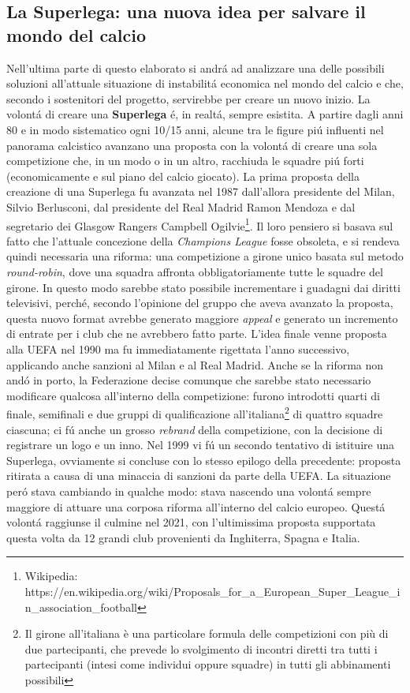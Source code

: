 \documentclass[
    corpo=12pt,
    oneside,
    evenboxes,
    tipotesi=triennale,
    stile=classica,
    oldstyle,
    autoretitolo,
    greek,
]{toptesi}
\begin{document}
\begin{interlinea}{1.5}
\chapter{La Superlega: una nuova idea per salvare il mondo del calcio}
Nell'ultima parte di questo elaborato si andr\'a ad analizzare una delle possibili soluzioni all'attuale situazione di 
instabilit\'a economica nel mondo del calcio e che, secondo i sostenitori del progetto, servirebbe per creare un nuovo inizio.
La volont\'a di creare una \textbf{Superlega} \'e, in realt\'a, sempre esistita. A partire dagli anni 80 e in modo sistematico ogni 10/15 
anni, alcune tra le figure pi\'u influenti nel panorama calcistico avanzano una proposta con la volont\'a di creare una sola competizione che,
in un modo o in un altro, racchiuda le squadre pi\'u forti (economicamente e sul piano del calcio giocato).\newline
La prima proposta della creazione di una Superlega fu avanzata nel 1987 dall'allora presidente del Milan, Silvio Berlusconi, dal presidente
del Real Madrid Ramon Mendoza e dal segretario dei Glasgow Rangers Campbell Ogilvie\footnote{Wikipedia: \newline https://en.wikipedia.org/wiki/Proposals\_for\_a\_European\_Super\_League\_in\_association\_football}.
Il loro pensiero si basava sul fatto che l'attuale concezione della \emph{Champions League} fosse obsoleta, e si rendeva quindi necessaria una riforma:
una competizione a girone unico basata sul metodo \emph{round-robin}, dove una squadra affronta obbligatoriamente tutte le squadre del girone. 
In questo modo sarebbe stato possibile incrementare i guadagni dai diritti televisivi, perch\'e, secondo l'opinione del gruppo che aveva 
avanzato la proposta, questa nuovo format avrebbe generato maggiore \emph{appeal} e generato un incremento di entrate per i club che 
ne avrebbero fatto parte. L'idea finale venne proposta alla UEFA nel 1990 ma fu immediatamente rigettata l'anno successivo, applicando anche 
sanzioni al Milan e al Real Madrid. Anche se la riforma non and\'o in porto, la Federazione decise comunque che sarebbe stato necessario modificare
qualcosa all'interno della competizione: furono introdotti quarti di finale, semifinali e due gruppi di qualificazione all'italiana\footnote{Il girone all'italiana è una particolare formula delle competizioni con più di due partecipanti, che prevede lo svolgimento di incontri diretti tra tutti i partecipanti (intesi come individui oppure squadre) in tutti gli abbinamenti possibili}
di quattro squadre ciascuna; ci f\'u anche un grosso \emph{rebrand} della competizione, con la decisione di registrare un logo e un inno.\newline
Nel 1999 vi f\'u un secondo tentativo di istituire una Superlega, ovviamente si concluse con lo stesso epilogo della precedente: proposta 
ritirata a causa di una minaccia di sanzioni da parte della UEFA. La situazione per\'o stava cambiando in qualche modo: 
stava nascendo una volont\'a sempre maggiore di attuare una corposa riforma all'interno del calcio europeo. Quest\'a volont\'a raggiunse il culmine
nel 2021, con l'ultimissima proposta supportata questa volta da 12 grandi club provenienti da Inghiterra, Spagna e Italia. 

\end{interlinea}
\end{document}
